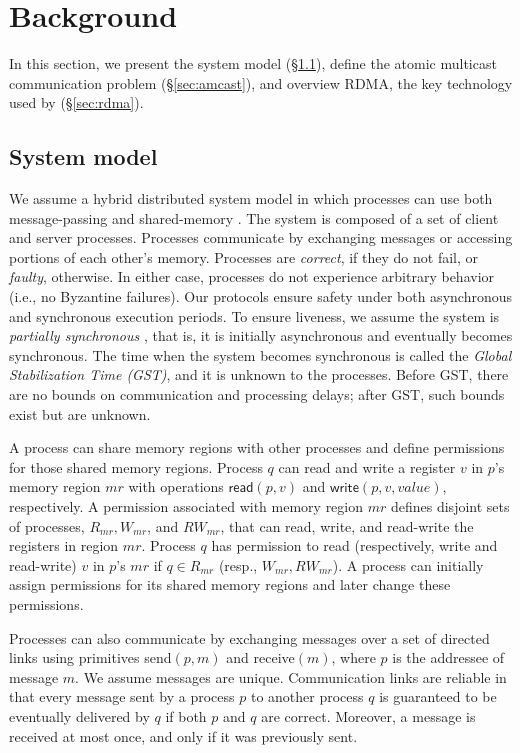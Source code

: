 \section{Background}
\label{sec:background}

In this section, we present the system model (\S\ref{sec:system-model}), define the atomic multicast communication problem (\S\ref{sec:amcast}), and  overview RDMA, the key technology used by \libname (\S\ref{sec:rdma}).

\subsection{System model}
\label{sec:system-model}

We assume a hybrid distributed system model in which processes can use both message-passing and shared-memory \cite{Aguilera2019}.
The system is composed of a set of client and server processes.
Processes communicate by exchanging messages or accessing portions of each other's memory.
Processes are \emph{correct}, if they do not fail, or \emph{faulty}, otherwise. 
In either case, processes do not experience arbitrary behavior (i.e., no Byzantine failures).
Our protocols ensure safety under both asynchronous and synchronous execution periods. 
To ensure liveness, we assume the system is \emph{partially synchronous} \cite{DLS88}, 
that is, it is initially asynchronous and eventually becomes synchronous. The time when the 
system becomes synchronous is called the \emph{Global Stabilization Time (GST)}, and it is unknown to the processes.
Before GST, there are no bounds on communication and processing delays; after GST, such bounds exist but are unknown. 

A process can share memory regions with other processes and define permissions for those shared memory regions. 
Process $q$ can read and write a register $v$ in $p$'s memory region $mr$ with operations $\textsf{read}(p,v)$ and $\textsf{write}(p,v,value)$, respectively.
A permission associated with memory region $mr$ defines disjoint sets of processes, $R_{mr}, W_{mr}$, and $RW_{mr}$, that can read, write, and read-write the registers in region $mr$. 
Process $q$ has permission to read (respectively, write and read-write) $v$ in $p$'s $mr$ if $q \in R_{mr}$ (resp., $W_{mr}, RW_{mr}$).
A process can initially assign permissions for its shared memory regions and later change these permissions.

Processes can also communicate by exchanging messages over a set of directed links using primitives \textsf{send}$(p, m)$ and \textsf{receive}$(m)$, where $p$ is the addressee of message $m$.
We assume messages are unique.
Communication links are reliable in that every message sent by a process $p$ to another process $q$ is guaranteed to be eventually delivered by $q$ if both $p$ and $q$ are correct.
Moreover, a message is received at most once, and only if it was previously sent.


